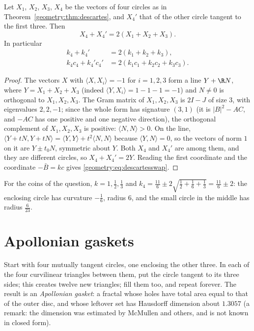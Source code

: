 \begin{proposition}\label{geometry:prop:swap}
Let $X_1$, $X_2$, $X_3$, $X_4$ be the vectors of four circles as in Theorem~\ref{geometry:thm:descartes}, and $X_4'$ that of the other circle tangent to the first
three. Then
\[
X_4+X_4'=2(X_1+X_2+X_3).
\]
In particular
\begin{equation}\label{geometry:eq:descartesswap}
\begin{aligned}
k_4+k_4'&=2(k_1+k_2+k_3),\\
k_4c_4+k_4'c_4'&=2(k_1c_1+k_2c_2+k_3c_3).
\end{aligned}
\end{equation}
\end{proposition}
\begin{proof}
The vectors $X$ with $\langle X,X_i\rangle=-1$ for $i=1,2,3$ form a line $Y+\R N$, where $Y=X_1+X_2+X_3$ (indeed $\langle Y,X_i\rangle=1-1-1=-1$) and $N\neq0$
is orthogonal to $X_1,X_2,X_3$. The Gram matrix of $X_1,X_2,X_3$ is $2I-J$ of size $3$, with eigenvalues $2,2,-1$; since the whole form has
signature $(3,1)$ (it is $|B|^2-AC$, and $-AC$ has one positive and one negative direction), the orthogonal complement of $X_1,X_2,X_3$ is
positive: $\langle N,N\rangle>0$. On the line, $\langle Y+tN,Y+tN\rangle=\langle Y,Y\rangle+t^2\langle N,N\rangle$ because $\langle Y,N\rangle=0$, so the
vectors of norm $1$ on it are $Y\pm t_0N$, symmetric about $Y$. Both $X_4$ and $X_4'$ are among them, and they are different circles, so
$X_4+X_4'=2Y$. Reading the first coordinate and the coordinate $-\bar B=kc$ gives \eqref{geometry:eq:descartesswap}.
\end{proof} For the coins of the question, $k=1,\frac12,\frac13$ and
$k_4=\frac{11}6\pm2\sqrt{\frac12+\frac16+\frac13}=\frac{11}6\pm2$: the enclosing circle has curvature $-\frac16$, radius $6$, and the small
circle in the middle has radius $\frac6{23}$.

\section{Apollonian gaskets}

Start with four mutually tangent circles, one enclosing the other three. In each of the four curvilinear triangles between them, put the
circle tangent to its three sides; this creates twelve new triangles; fill them too, and repeat forever. The result is an \emph{Apollonian
gasket}: a fractal whose holes have total area equal to that of the outer disc, and whose leftover set has Hausdorff dimension about
$1.3057$ (a remark: the dimension was estimated by McMullen and others, and is not known in closed form).

